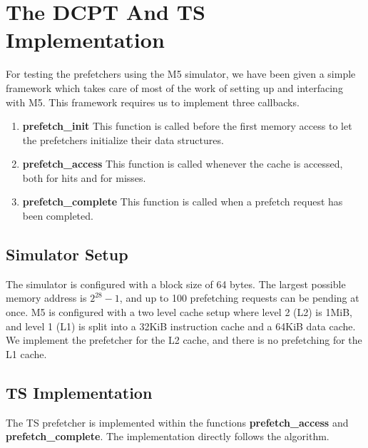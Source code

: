 \section{The DCPT And TS Implementation}
\label{section:scheme}

For testing the prefetchers using the M5 simulator, we have been given a simple
framework which takes care of most of the work of setting up and interfacing with
M5. This framework requires us to implement three callbacks.

\begin{enumerate}
	\item \textbf{prefetch\_init}
		This function is called before the first memory access to let the
		prefetchers initialize their data structures.
	\item \textbf{prefetch\_access}
		This function is called whenever the cache is accessed, both for hits
		and for misses.
	\item \textbf{prefetch\_complete}
		This function is called when a prefetch request has been completed.
\end{enumerate}

\subsection{Simulator Setup}

The simulator is configured with a block size of 64 bytes. The largest possible
memory address is $2^{28}-1$, and up to 100 prefetching requests can be pending
at once. M5 is configured with a two level cache setup where level 2 (L2) is 1MiB, 
and level 1 (L1) is split into a 32KiB instruction cache and a 64KiB data
cache. We implement the prefetcher for the L2 cache, and there is no prefetching 
for the L1 cache. 


\subsection{TS Implementation}

The TS prefetcher is implemented within the functions \textbf{prefetch\_access}
and \textbf{prefetch\_complete}. The implementation directly follows the
algorithm.

